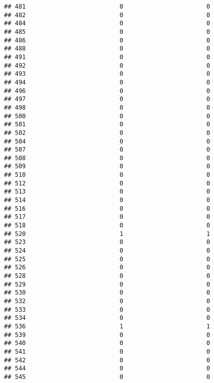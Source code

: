 \documentclass[
]{article}
\begin{document}
\begin{verbatim}
## 481                          0                       0
## 482                          0                       0
## 484                          0                       0
## 485                          0                       0
## 486                          0                       0
## 488                          0                       0
## 491                          0                       0
## 492                          0                       0
## 493                          0                       0
## 494                          0                       0
## 496                          0                       0
## 497                          0                       0
## 498                          0                       0
## 500                          0                       0
## 501                          0                       0
## 502                          0                       0
## 504                          0                       0
## 507                          0                       0
## 508                          0                       0
## 509                          0                       0
## 510                          0                       0
## 512                          0                       0
## 513                          0                       0
## 514                          0                       0
## 516                          0                       0
## 517                          0                       0
## 518                          0                       0
## 520                          1                       1
## 523                          0                       0
## 524                          0                       0
## 525                          0                       0
## 526                          0                       0
## 528                          0                       0
## 529                          0                       0
## 530                          0                       0
## 532                          0                       0
## 533                          0                       0
## 534                          0                       0
## 536                          1                       1
## 539                          0                       0
## 540                          0                       0
## 541                          0                       0
## 542                          0                       0
## 544                          0                       0
## 545                          0                       0

\end{verbatim}
\end{document}
